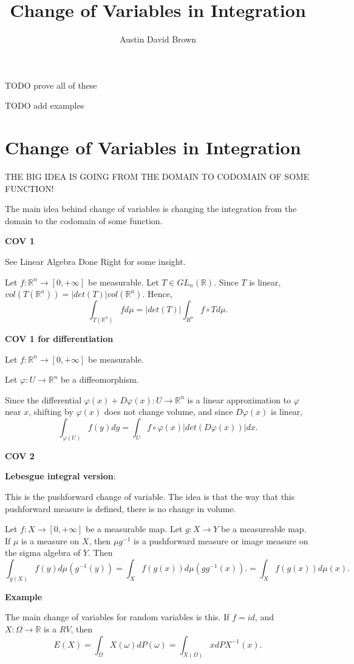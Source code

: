 \documentclass[12pt, reqno]{amsart}
\numberwithin{equation}{section}
\newcommand{\R}{\mathbb{R}}
\let\phi\varphi
\begin{document}
\title{Change of Variables in Integration}
\author{Austin David Brown}
\maketitle

TODO prove all of these

TODO add examples

\section{Change of Variables in Integration}

THE BIG IDEA IS GOING FROM THE DOMAIN TO CODOMAIN OF SOME FUNCTION!

The main idea behind change of variables is changing the integration from the domain to the codomain of some function.

\textbf{COV 1}

See Linear Algebra Done Right for some insight.

Let $f : \R^n \to [0, +\infty]$ be measurable.
Let $T \in GL_n(\R).$
Since $T$ is linear, $vol(T(\R^n)) = |det(T) | vol(\R^n)$. Hence,
\[
\int_{T(\R^n)} f d\mu
= | det(T) | \int_{R^n} f \circ T d\mu.
\]

\textbf{COV 1 for differentiation}

Let $f : \R^n \to [0, +\infty]$ be measurable.

Let $\phi : U \to \R^n$ be a diffeomorphism.

Since the differential $\phi(x) + D\phi(x) : U \to \R^n$ is a linear approximation to $\phi$ near $x$, shifting by $\phi(x)$ does not change volume, and since $D\phi(x)$ is linear,
\[
\int_{\phi(U)} f(y) dy
= \int_{U} f \circ \phi (x) |det( D\phi(x) ) | dx.
\]

\textbf{COV 2}

\textbf{Lebesgue integral version}:

This is the pushforward change of variable. The idea is that the way that this pushforward measure is defined, there is no change in volume.

Let $f : X \to [0, +\infty]$ be a measurable map. Let $g : X \to Y$ be a measureable map. If $\mu$ is a measure on $X$, then $\mu g^{-1}$ is a pushforward measure or image measure on the sigma algebra of $Y$.
Then
\[
\int_{g(X)} f(y) d \mu(g^{-1}(y))
= \int_X f(g(x)) d \mu(g g^{-1} (x)).
= \int_X f(g(x)) d \mu(x).
\]

\textbf{Example}

The main change of variables for random variables is this.
If $f = id$, and $X : \Omega \to \R$ is a $RV$, then
\[
E(X) = \int_{\Omega} X(\omega) dP(\omega)
= \int_{X(\Omega)} x dPX^{-1}(x).
\]
\end{document}
